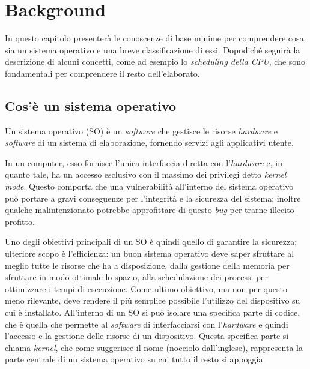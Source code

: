 \chapter{Background}
In questo capitolo presenterà le conoscenze di base minime per comprendere cosa sia un sistema operativo e una breve classificazione di essi. Dopodiché seguirà la descrizione di alcuni concetti, come ad esempio lo \textit{scheduling della CPU}, che sono fondamentali per comprendere il resto dell'elaborato.

\section{Cos'è un sistema operativo}
Un sistema operativo (SO) è un \textit{software} che gestisce le risorse \textit{hardware} e \textit{software} di un sistema di elaborazione, fornendo servizi agli applicativi utente.

In un computer, esso fornisce l'unica interfaccia diretta con l'\textit{hardware} e, in quanto tale, ha un accesso esclusivo con il massimo dei privilegi detto \textit{kernel mode}. Questo comporta che una vulnerabilità all'interno del sistema operativo può portare a gravi conseguenze per l'integrità e la sicurezza del sistema; inoltre qualche malintenzionato potrebbe approfittare di questo \textit{bug} per trarne illecito profitto.

Uno degli obiettivi principali di un SO è quindi quello di garantire la sicurezza; ulteriore scopo è l'efficienza: un buon sistema operativo deve saper sfruttare al meglio tutte le risorse che ha a disposizione, dalla gestione della memoria per sfruttare in modo ottimale lo spazio, alla schedulazione dei processi per ottimizzare i tempi di esecuzione. Come ultimo obiettivo, ma non per questo meno rilevante, deve rendere il più semplice possibile l'utilizzo del dispositivo su cui è installato.
All'interno di un SO si può isolare una specifica parte di codice, che è quella che permette al \textit{software} di interfacciarsi con l'\textit{hardware} e quindi l'accesso e la gestione delle risorse di un dispositivo. Questa specifica parte si chiama \textit{kernel}, che come suggerisce il nome (nocciolo dall'inglese), rappresenta la parte centrale di un sistema operativo su cui tutto il resto si appoggia.
\newpage


